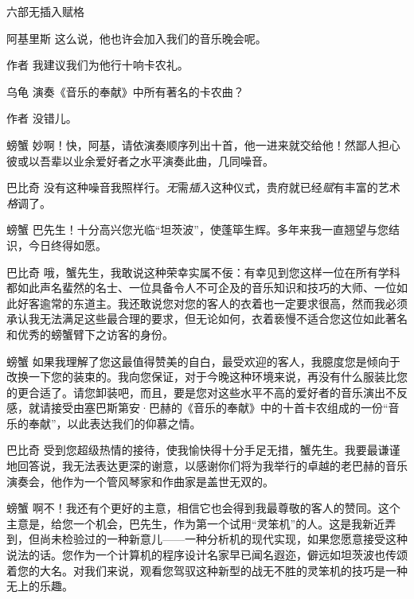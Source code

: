 \begin{dialog}{六部无插入赋格}
\begin{dialogue}
\item[阿基里斯]这么说，他也许会加入我们的音乐晚会呢。

\item[作者]我建议我们为他行十响卡农礼。

\item[乌龟]演奏《音乐的奉献》中所有著名的卡农曲？

\item[作者]没错儿。

\item[螃蟹]妙啊！快，阿基，请依演奏顺序列出十首，他一进来就交给他！然鄙人担心彼或以吾辈以业余爱好者之水平演奏此曲，几同噪音。


\item[巴比奇]没有这种噪音我照样行。\emph{无}需\emph{插入}这种仪式，贵府就已经\emph{赋}有丰富的艺术\emph{格}调了。

\item[螃蟹]巴先生！十分高兴您光临“坦茨波”，使蓬筚生辉。多年来我一直翘望与您结识，今日终得如愿。

\item[巴比奇]哦，蟹先生，我敢说这种荣幸实属不佞：有幸见到您这样一位在所有学科都如此声名蜚然的名士、一位具备令人不可企及的音乐知识和技巧的大师、一位如此好客逾常的东道主。我还敢说您对您的客人的衣着也一定要求很高，然而我必须承认我无法满足这些最合理的要求，但无论如何，衣着亵慢不适合您这位如此著名和优秀的螃蟹臂下之访客的身份。

\item[螃蟹]如果我理解了您这最值得赞美的自白，最受欢迎的客人，我臆度您是倾向于改换一下您的装束的。我向您保证，对于今晚这种环境来说，再没有什么服装比您的更合适了。请您卸装吧，而且，要是您对这些水平不高的爱好者的音乐演出不反感，就请接受由塞巴斯第安·巴赫的《音乐的奉献》中的十首卡农组成的一份“音乐的奉献”，以此表达我们的仰慕之情。

\item[巴比奇]受到您超级热情的接待，使我愉快得十分手足无措，蟹先生。我要最谦谨地回答说，我无法表达更深的谢意，以感谢你们将为我举行的卓越的老巴赫的音乐演奏会，他作为一个管风琴家和作曲家是盖世无双的。

\item[螃蟹]啊不！我还有个更好的主意，相信它也会得到我最尊敬的客人的赞同。这个主意是，给您一个机会，巴先生，作为第一个试用“灵笨机”的人。这是我新近弄到，但尚未检验过的一种新意儿——一种分析机的现代实现，如果您愿意接受这种说法的话。您作为一个计算机的程序设计名家早已闻名遐迩，僻远如坦茨波也传颂着您的大名。对我们来说，观看您驾驭这种新型的战无不胜的灵笨机的技巧是一种无上的乐趣。


\end{dialogue}
\end{dialog}
